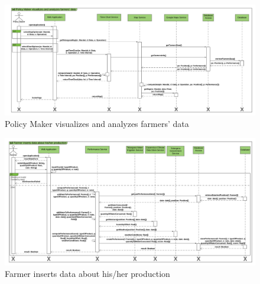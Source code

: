 \newpage
\begin{landscape}
\begin{figure}[h]
\vspace*{-2cm}
\noindent
\centering
\centerline{\includegraphics[scale= 0.108]{./Images/Policy Maker visualizes and analyzes farmers' data.png}}
    \caption{Policy Maker visualizes and analyzes farmers' data}
    \vspace*{-12cm}
\end{figure}
\fillandplacepagenumber
\end{landscape}


\newpage
\begin{landscape}
\begin{figure}[h]
\vspace*{-2cm}
\noindent
\centering
\centerline{\includegraphics[scale= 0.108]{./Images/Farmer inserts data about his_her production.png}}
    \caption{Farmer inserts data about his/her production}
    \vspace*{-12cm}
\end{figure}
\fillandplacepagenumber
\end{landscape}


